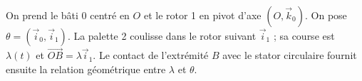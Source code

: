 \begin{corrigebox}
On prend le bâti 0 centré en $O$ et le rotor 1 en pivot d'axe
$(O,\vec k_0)$. On pose $\theta=(\vec i_0,\vec i_1)$. La palette 2 coulisse
dans le rotor suivant $\vec i_1$ ; sa course est $\lambda(t)$ et
$\overrightarrow{OB}=\lambda\vec i_1$. Le contact de l'extrémité $B$ avec
le stator circulaire fournit ensuite la relation géométrique entre
$\lambda$ et $\theta$.
\end{corrigebox}

